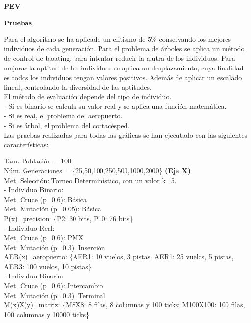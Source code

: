 \begin{flushleft}
	\textbf{PEV}
	\begin{mdframed}[roundcorner=5pt]
		\textbf{\underline{Pruebas}}
		\vspace{0.1cm}
		
		\scriptsize		
		Para el algoritmo se ha aplicado un elitismo de 5\% conservando los mejores individuos de cada generación. Para el problema de árboles se aplica un método de control de bloating, para intentar reducir la alutra de los individuos. 		
		Para mejorar la aptitud de los individuos se aplica un desplazamiento, cuya finalidad es todos los individuos tengan valores positivos. Además de aplicar un escalado lineal, controlando la diversidad de las aptitudes.\\
		
		El método de evaluación depende del tipo de individuo. \\
		- Si es binario se calcula su valor real y se aplica una función matemática.  \\
		- Si es real, el problema del aeropuerto. \\
		- Si es árbol, el problema del cortacésped.\\
		
		Las pruebas realizadas para todas las gráficas se han ejecutado con las siguientes características:
		\begin{tcolorbox}[boxrule=0.5pt, fontupper=\small]
			\scriptsize
			Tam. Población = 100\\
			Núm. Generaciones = \{25,50,100,250,500,1000,2000\} \textbf{(Eje X)}\\
			Met. Selección: Torneo Determinístico, con un valor k=5.\\
			
			- Individuo Binario:\\
			Met. Cruce (p=0.6): Básica\\
			Met. Mutación (p=0.05): Básica \\
			P(x)=precision: \{P2: 30 bits, P10: 76 bits\}\\
			
			- Individuo Real:\\
			Met. Cruce (p=0.6): PMX\\
			Met. Mutación (p=0.3): Inserción \\
			AER(x)=aeropuerto: \{AER1: 10 vuelos, 3 pistas, AER1: 25 vuelos, 5 pistas, AER3: 100 vuelos, 10 pistas\}\\
			
			- Individuo Binario:\\
			Met. Cruce (p=0.6): Intercambio\\
			Met. Mutación (p=0.3): Terminal \\
			M(x)X(y)=matriz: \{M8X8: 8 filas, 8 columnas y 100 ticks; M100X100: 100 filas, 100 columnas y 10000 ticks\}
			
			
			
			
		\end{tcolorbox}
		
	\end{mdframed}
\end{flushleft}

